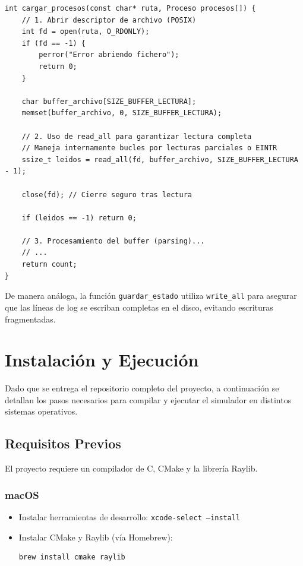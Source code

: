 \documentclass[11pt,a4paper]{article}
\begin{document}
\begin{lstlisting}[caption={Lectura robusta del fichero de entrada}, label={lst:file_utils_usage}]
int cargar_procesos(const char* ruta, Proceso procesos[]) {
    // 1. Abrir descriptor de archivo (POSIX)
    int fd = open(ruta, O_RDONLY);
    if (fd == -1) {
        perror("Error abriendo fichero");
        return 0;
    }

    char buffer_archivo[SIZE_BUFFER_LECTURA];
    memset(buffer_archivo, 0, SIZE_BUFFER_LECTURA);

    // 2. Uso de read_all para garantizar lectura completa
    // Maneja internamente bucles por lecturas parciales o EINTR
    ssize_t leidos = read_all(fd, buffer_archivo, SIZE_BUFFER_LECTURA - 1);
    
    close(fd); // Cierre seguro tras lectura

    if (leidos == -1) return 0;

    // 3. Procesamiento del buffer (parsing)...
    // ...
    return count;
}
\end{lstlisting}

De manera análoga, la función \texttt{guardar\_estado} utiliza \texttt{write\_all} para asegurar que las líneas de log se escriban completas en el disco, evitando escrituras fragmentadas.

\section{Instalación y Ejecución}

Dado que se entrega el repositorio completo del proyecto, a continuación se detallan los pasos necesarios para compilar y ejecutar el simulador en distintos 
sistemas operativos.

\subsection{Requisitos Previos}

El proyecto requiere un compilador de C, CMake y la librería Raylib.

\subsubsection{macOS}
\begin{itemize}
    \item Instalar herramientas de desarrollo: \texttt{xcode-select --install}
    \item Instalar CMake y Raylib (vía Homebrew):
    \begin{lstlisting}[language=bash]
brew install cmake raylib
    \end{lstlisting}
\end{itemize}
\end{document}
